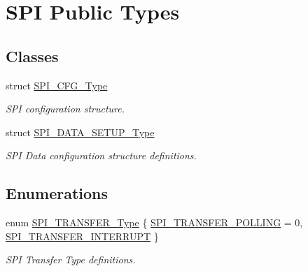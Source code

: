 \hypertarget{group___s_p_i___public___types}{\section{\-S\-P\-I \-Public \-Types}
\label{group___s_p_i___public___types}
}
\subsection*{\-Classes}
\begin{DoxyCompactItemize}
\item 
struct \hyperlink{struct_s_p_i___c_f_g___type}{\-S\-P\-I\-\_\-\-C\-F\-G\-\_\-\-Type}
\begin{DoxyCompactList}\small\item\em \-S\-P\-I configuration structure. \end{DoxyCompactList}\item 
struct \hyperlink{struct_s_p_i___d_a_t_a___s_e_t_u_p___type}{\-S\-P\-I\-\_\-\-D\-A\-T\-A\-\_\-\-S\-E\-T\-U\-P\-\_\-\-Type}
\begin{DoxyCompactList}\small\item\em \-S\-P\-I \-Data configuration structure definitions. \end{DoxyCompactList}\end{DoxyCompactItemize}
\subsection*{\-Enumerations}
\begin{DoxyCompactItemize}
\item 
enum \hyperlink{group___s_p_i___public___types_ga0003ce5a6b4371e13d99dcce3fcada70}{\-S\-P\-I\-\_\-\-T\-R\-A\-N\-S\-F\-E\-R\-\_\-\-Type} \{ \hyperlink{group___s_p_i___public___types_gga0003ce5a6b4371e13d99dcce3fcada70a4a0b5546343ee5eb0389f91936e3a223}{\-S\-P\-I\-\_\-\-T\-R\-A\-N\-S\-F\-E\-R\-\_\-\-P\-O\-L\-L\-I\-N\-G} =  0, 
\hyperlink{group___s_p_i___public___types_gga0003ce5a6b4371e13d99dcce3fcada70ac985805b966252076cbc82d4768545fd}{\-S\-P\-I\-\_\-\-T\-R\-A\-N\-S\-F\-E\-R\-\_\-\-I\-N\-T\-E\-R\-R\-U\-P\-T}
 \}
\begin{DoxyCompactList}\small\item\em \-S\-P\-I \-Transfer \-Type definitions. \end{DoxyCompactList}\end{DoxyCompactItemize}


